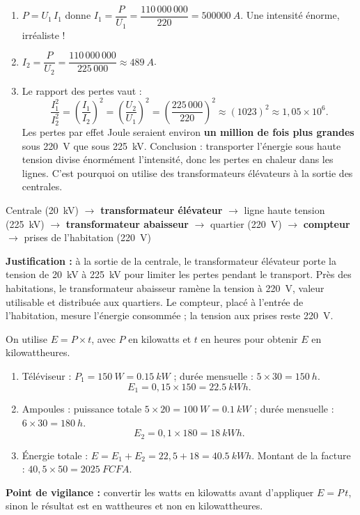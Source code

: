 \documentclass[11pt]{article}
\begin{document}
\begin{corrige}
\begin{enumerate}
\item $P = U_1\,I_1$ donne $I_1 = \dfrac{P}{U_1} = \dfrac{110\,000\,000}{220} = \SI{500000}{A}$. Une intensité énorme, irréaliste !
\item $I_2 = \dfrac{P}{U_2} = \dfrac{110\,000\,000}{225\,000} \approx \SI{489}{A}$.
\item Le rapport des pertes vaut :
\[ \frac{I_1^2}{I_2^2} = \left(\frac{I_1}{I_2}\right)^2 = \left(\frac{U_2}{U_1}\right)^2 = \left(\frac{225\,000}{220}\right)^2 \approx (1023)^2 \approx 1{,}05 \times 10^{6}. \]
Les pertes par effet Joule seraient environ \textbf{un million de fois plus grandes} sous \SI{220}{V} que sous \SI{225}{kV}. Conclusion : transporter l'énergie sous haute tension divise énormément l'intensité, donc les pertes en chaleur dans les lignes. C'est pourquoi on utilise des transformateurs élévateurs à la sortie des centrales.
\end{enumerate}
\end{corrige}

\begin{corrige}
\begin{center}
Centrale (\SI{20}{kV}) $\longrightarrow$ \textbf{transformateur élévateur} $\longrightarrow$ ligne haute tension (\SI{225}{kV}) $\longrightarrow$ \textbf{transformateur abaisseur} $\longrightarrow$ quartier (\SI{220}{V}) $\longrightarrow$ \textbf{compteur} $\longrightarrow$ prises de l'habitation (\SI{220}{V})
\end{center}
\textbf{Justification :} à la sortie de la centrale, le transformateur élévateur porte la tension de \SI{20}{kV} à \SI{225}{kV} pour limiter les pertes pendant le transport. Près des habitations, le transformateur abaisseur ramène la tension à \SI{220}{V}, valeur utilisable et distribuée aux quartiers. Le compteur, placé à l'entrée de l'habitation, mesure l'énergie consommée ; la tension aux prises reste \SI{220}{V}.
\end{corrige}

\begin{corrige}
On utilise $E = P \times t$, avec $P$ en kilowatts et $t$ en heures pour obtenir $E$ en kilowattheures.
\begin{enumerate}
\item Téléviseur : $P_1 = \SI{150}{W} = \SI{0,15}{kW}$ ; durée mensuelle : $5 \times 30 = \SI{150}{h}$.
\[ E_1 = 0{,}15 \times 150 = \SI{22,5}{kWh}. \]
\item Ampoules : puissance totale $5 \times 20 = \SI{100}{W} = \SI{0,1}{kW}$ ; durée mensuelle : $6 \times 30 = \SI{180}{h}$.
\[ E_2 = 0{,}1 \times 180 = \SI{18}{kWh}. \]
\item Énergie totale : $E = E_1 + E_2 = 22{,}5 + 18 = \SI{40,5}{kWh}$.
Montant de la facture : $40{,}5 \times 50 = \SI{2025}{FCFA}$.
\end{enumerate}
\textbf{Point de vigilance :} convertir les watts en kilowatts avant d'appliquer $E = P\,t$, sinon le résultat est en wattheures et non en kilowattheures.
\end{corrige}
\end{document}
